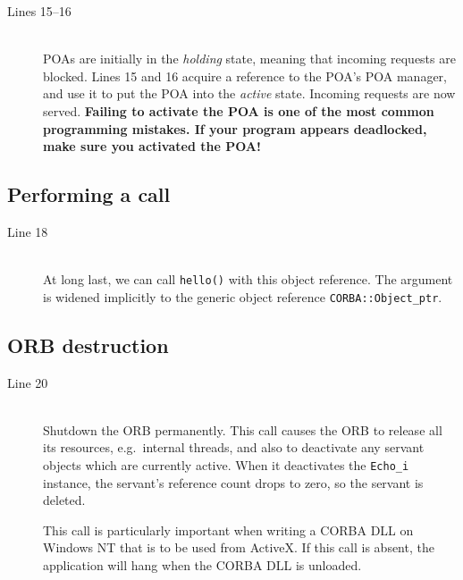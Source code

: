\documentclass[11pt,oneside,a4paper]{book}
\newcommand{\type}[1]{\texttt{#1}}
\newcommand{\op}[1]{\texttt{#1()}}
\newcommand{\term}[1]{\textit{#1}}
\begin{document}
\begin{description}

\item[Lines 15--16]\mbox{}\\
%
POAs are initially in the \term{holding} state, meaning that incoming
requests are blocked. Lines 15 and 16 acquire a reference to the POA's
POA manager, and use it to put the POA into the \term{active} state.
Incoming requests are now served. \textbf{Failing to activate the POA
is one of the most common programming mistakes. If your program
appears deadlocked, make sure you activated the POA!}

\end{description}


\subsection{Performing a call}

\begin{description}

\item[Line 18]\mbox{}\\
%
At long last, we can call \op{hello} with this object reference. The
argument is widened implicitly to the generic object reference
\type{CORBA::Object\_ptr}.

\end{description}


\subsection{ORB destruction}

\begin{description}

\item[Line 20]\mbox{}\\
%
Shutdown the ORB permanently. This call causes the ORB to release all
its resources, e.g.\ internal threads, and also to deactivate any
servant objects which are currently active. When it deactivates the
\type{Echo\_i} instance, the servant's reference count drops to zero,
so the servant is deleted.

This call is particularly important when writing a CORBA DLL on
Windows NT that is to be used from ActiveX. If this call is absent,
the application will hang when the CORBA DLL is unloaded.

\end{description}
\end{document}
